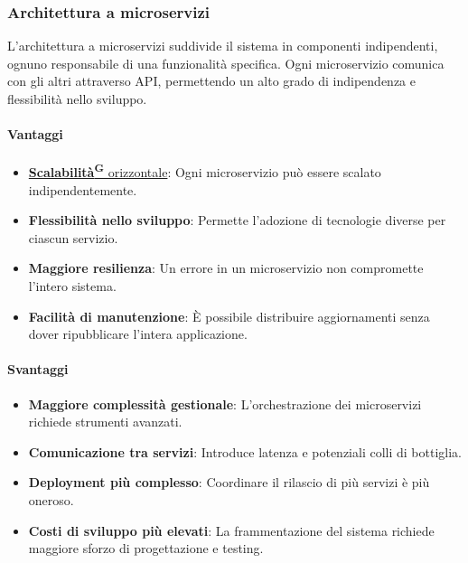 \subsubsection{Architettura a microservizi}
L’architettura a microservizi suddivide il sistema in componenti indipendenti, ognuno responsabile di una funzionalità specifica. Ogni microservizio comunica con gli altri attraverso API, permettendo un alto grado di indipendenza e flessibilità nello sviluppo.
\paragraph{Vantaggi}  
\begin{itemize}
    \item \href{https://code7crusaders.github.io/docs/PB/documentazione_interna/glossario.html#scalabilità}{\textbf{Scalabilità\textsuperscript{G}} orizzontale}: Ogni microservizio può essere scalato indipendentemente.
    \item \textbf{Flessibilità nello sviluppo}: Permette l’adozione di tecnologie diverse per ciascun servizio.
    \item \textbf{Maggiore resilienza}: Un errore in un microservizio non compromette l’intero sistema.
    \item \textbf{Facilità di manutenzione}: È possibile distribuire aggiornamenti senza dover ripubblicare l’intera applicazione.
\end{itemize}
\paragraph{Svantaggi}  
\begin{itemize}
    \item \textbf{Maggiore complessità gestionale}: L’orchestrazione dei microservizi richiede strumenti avanzati.
    \item \textbf{Comunicazione tra servizi}: Introduce latenza e potenziali colli di bottiglia.
    \item \textbf{Deployment più complesso}: Coordinare il rilascio di più servizi è più oneroso.
    \item \textbf{Costi di sviluppo più elevati}: La frammentazione del sistema richiede maggiore sforzo di progettazione e testing.
\end{itemize}

